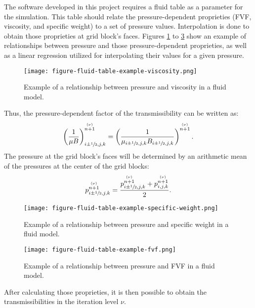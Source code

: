 The software developed in this project requires a fluid table as a parameter for the simulation.
%
This table should relate the pressure-dependent proprieties (FVF, viscosity, and specific weight) to a set of pressure values.
%
Interpolation is done to obtain those proprieties at grid block's faces.
%
Figures \ref{figure-fluid-table-example-viscosity} to \ref{figure-fluid-table-example-fvf} show an example of relationships between pressure and those pressure-dependent proprieties, as well as a linear regression utilized for interpolating their values for a given pressure.
%
\begin{figure}[H]
	\centering
	\texttt{[image: figure-fluid-table-example-viscosity.png]}\\
	\caption{Example of a relationship between pressure and viscosity in a fluid model.}
	\label{figure-fluid-table-example-viscosity}
\end{figure}
%
Thus, the pressure-dependent factor of the transmissibility can be written as:
%
\begin{align}
	\left(\frac{1}{\mu B}\right)_{i\pm\sfrac{1}{2},j,k}^{\stackrel{(\nu)}{n+1}}=\left(\frac{1}{\mu_{i\pm\sfrac{1}{2},j,k} B_{i\pm\sfrac{1}{2},j,k}}\right)^{\stackrel{(\nu)}{n+1}}.
\end{align}
%
The pressure at the grid block's faces will be determined by an arithmetic mean of the pressures at the center of the grid blocks:
%
\begin{align}
	p_{i\pm\sfrac{1}{2},j,k}^{\stackrel{(\nu)}{n+1}}=\frac{p^{\stackrel{(\nu)}{n+1}}_{i\pm\sfrac{1}{2},j,k}+p^{\stackrel{(\nu)}{n+1}}_{i,j,k}}{2}.
\end{align}
%
\begin{figure}[H]
	\centering
	\texttt{[image: figure-fluid-table-example-specific-weight.png]}\\
	\caption{Example of a relationship between pressure and specific weight in a fluid model.}
	\label{figure-fluid-table-example-specific-weight}
\end{figure}
%
\begin{figure}[H]
	\centering
	\texttt{[image: figure-fluid-table-example-fvf.png]}\\
	\caption{Example of a relationship between pressure and FVF in a fluid model.}
	\label{figure-fluid-table-example-fvf}
\end{figure}
%
\noindent
After calculating those proprieties, it is then possible to obtain the transmissibilities in the iteration level $\nu$.
